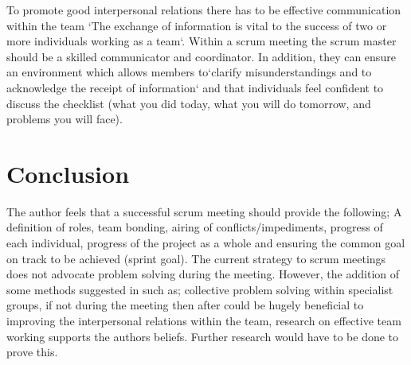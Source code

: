 \documentclass{scrartcl}
\begin{document}
To promote good interpersonal relations there has to be effective communication within the team `The exchange of information is vital to the success of two or more individuals working as a team`\cite [p. 559]{fletcher2006effects}. Within a scrum meeting the scrum master should be a skilled communicator and coordinator. In addition, they can ensure an environment which allows members to`clarify misunderstandings and to acknowledge the receipt of information`\cite [p. 559]{fletcher2006effects} and that individuals feel confident to discuss the checklist (what you did today, what you will do tomorrow, and problems you will face). 


\section{Conclusion}
The author feels that a successful scrum meeting should provide the following; A definition of roles, team bonding, airing of conflicts/impediments, progress of each individual, progress of the project as a whole and ensuring the common goal on track to be achieved (sprint goal).  The current strategy to scrum meetings does not advocate problem solving during the meeting. However, the addition of some methods suggested in  \cite{LeadershipLesson} such as; collective problem solving within specialist groups, if not during the meeting then after could be hugely beneficial to improving the interpersonal relations within the team, research on effective team working supports the authors beliefs. Further research would have to be done to prove this.



\end{document}
